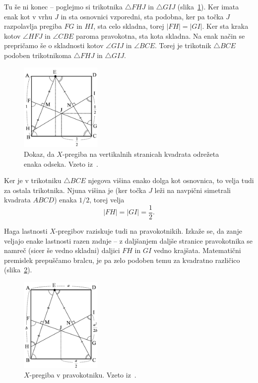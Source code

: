 Tu še ni konec -- poglejmo si trikotnika $\triangle FHJ$ in $\triangle GIJ$ (slika~\ref{fig:x-pregib_dokaz_odsek}). Ker imata enak kot v vrhu $J$ in sta osnovnici vzporedni, sta podobna, ker pa točka $J$ razpolavlja pregiba $FG$ in $HI$, sta celo skladna, torej $|FH| = |GI|$. Ker sta kraka kotov $\angle HFJ$ in $\angle CBE$ paroma pravokotna, sta kota skladna. Na enak način se prepričamo še o skladnosti kotov $\angle GIJ$ in $\angle BCE$. Torej je trikotnik $\triangle BCE$ podoben trikotnikoma $\triangle FHJ$ in $\triangle GIJ$.
\begin{figure}[h]
    \centering
    \includegraphics[width=0.35\textwidth]{images/x-pregibi/dokaz_odseki.png}
    \caption[Dokaz za dolžini odsekov $X$-pregibov]{Dokaz, da $X$-pregiba na vertikalnih stranicah kvadrata odrežeta enaka odseka. Vzeto iz~\cite[str.\ 41]{haga2008}.}
    \label{fig:x-pregib_dokaz_odsek}
\end{figure}
Ker je v trikotniku $\triangle BCE$ njegova višina enako dolga kot osnovnica, to velja tudi za ostala trikotnika. Njuna višina je (ker točka $J$ leži na navpični simetrali kvadrata $ABCD$) enaka $1/2$, torej velja
$$ |FH| = |GI| = \frac{1}{2}. $$

Haga lastnosti $X$-pregibov raziskuje tudi na pravokotnikih. Izkaže se, da zanje veljajo enake lastnosti razen zadnje -- z daljšanjem daljše stranice pravokotnika se namreč (sicer še vedno skladni) daljici $FH$ in $GI$ vedno krajšata. Matematični premislek prepuščamo bralcu, je pa zelo podoben temu za kvadratno različico (slika~\ref{fig:x-pregib_dokaz_pravokotnik}).

\begin{figure}[h]
    \centering
    \includegraphics[width=0.35\textwidth]{images/x-pregibi/dokaz_pravokotnik.png}
    \caption[$X$-pregiboa v pravokotniku]{$X$-pregiba v pravokotniku. Vzeto iz~\cite[str.\ 44]{haga2008}.}
    \label{fig:x-pregib_dokaz_pravokotnik}
\end{figure}